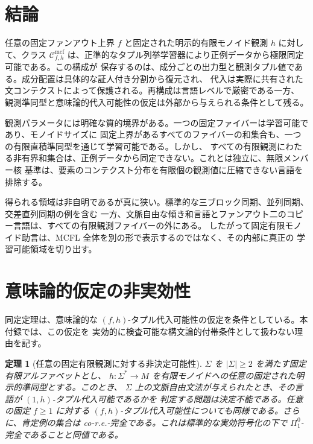 \documentclass[11pt,a4paper]{ltjsarticle}
\newtheorem{theorem}{定理}[section]
\theoremstyle{remark}
\newcommand{\Cmcf}[2]{\mathcal{C}^{\mathrm{mcf}}_{#1,#2}}
\begin{document}
\section{結論}
\label{sec:conclusion}

任意の固定ファンアウト上界 \(f\) と固定された明示的有限モノイド観測 \(h\) に対して、クラス
\(\Cmcf{f}{h}\) は、正準的なタプル列挙学習器により正例データから極限同定可能である。この構成が
保存するのは、成分ごとの出力型と観測タプル値である。成分配置は具体的な証人付き分割から復元され、
代入は実際に共有された文コンテクストによって保護される。再構成は言語レベルで厳密である一方、
観測準同型と意味論的代入可能性の仮定は外部から与えられる条件として残る。

観測パラメータには明確な質的境界がある。一つの固定ファイバーは学習可能であり、モノイドサイズに
固定上界があるすべてのファイバーの和集合も、一つの有限直積準同型を通じて学習可能である。しかし、
すべての有限観測にわたる非有界和集合は、正例データから同定できない。これとは独立に、無限メンバー核
基準は、要素のコンテクスト分布を有限個の観測値に圧縮できない言語を排除する。

得られる領域は非自明であるが真に狭い。標準的な三ブロック同期、並列同期、交差直列同期の例を含む
一方、文脈自由な傾き和言語とファンアウト二のコピー言語は、すべての有限観測ファイバーの外にある。
したがって固定有限モノイド助言は、MCFL 全体を別の形で表示するのではなく、その内部に真正の
学習可能領域を切り出す。


\appendix
\section{意味論的仮定の非実効性}
\label{app:semantic-promise}

同定定理は、意味論的な \((f,h)\)-タプル代入可能性の仮定を条件としている。本付録では、この仮定を
実効的に検査可能な構文論的付帯条件として扱わない理由を記す。

\begin{theorem}[任意の固定有限観測に対する非決定可能性]
\label{thm:promise-undecidable}
\(\Sigma\) を \(|\Sigma|\ge2\) を満たす固定有限アルファベットとし、
\(h:\Sigma^*\to M\) を有限モノイドへの任意の固定された明示的準同型とする。このとき、
\(\Sigma\) 上の文脈自由文法が与えられたとき、その言語が \((1,h)\)-タプル代入可能であるかを
判定する問題は決定不能である。任意の固定 \(f\ge1\) に対する
\((f,h)\)-タプル代入可能性についても同様である。さらに、肯定例の集合は co-r.e.-完全である。これは標準的な実効符号化の下で
\(\Pi^0_1\)-完全であることと同値である。
\end{theorem}
\end{document}
